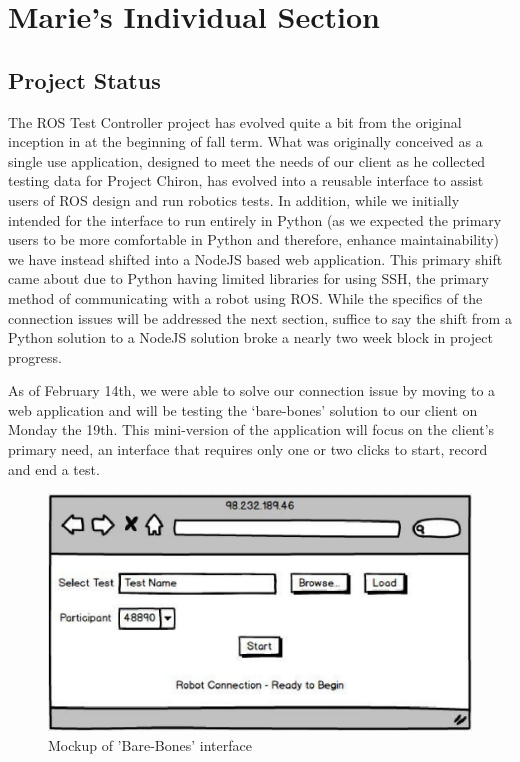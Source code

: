 \documentclass[onecolumn, draftclsnofoot,10pt, compsoc]{IEEEtran}
\begin{document}
\section{Marie's Individual Section}
\subsection{Project Status}
The ROS Test Controller project has evolved quite a bit from the original inception in at the beginning of fall term. What was originally conceived as a single use application, designed to meet the needs of our client as he collected testing data for Project Chiron, has evolved into a reusable interface to assist users of ROS design and run robotics tests. In addition, while we initially intended for the interface to run entirely in Python (as we expected the primary users to be more comfortable in Python and therefore, enhance maintainability) we have instead shifted into a NodeJS based web application. This primary shift came about due to Python having limited libraries for using SSH, the primary method of communicating with a robot using ROS. While the specifics of the connection issues will be addressed the next section, suffice to say the shift from a Python solution to a NodeJS solution broke a nearly two week block in project progress. 

As of February 14th, we were able to solve our connection issue by moving to a web application and will be testing the ‘bare-bones’ solution to our client on Monday the 19th. This mini-version of the application will focus on the client’s primary need, an interface that requires only one or two clicks to start, record and end a test.

\begin{figure}[H]
	\centering
	\includegraphics[scale=0.6]{BarebonesMockup.eps}
	\centering
	\caption{Mockup of 'Bare-Bones' interface}
\end{figure}
\end{document}
